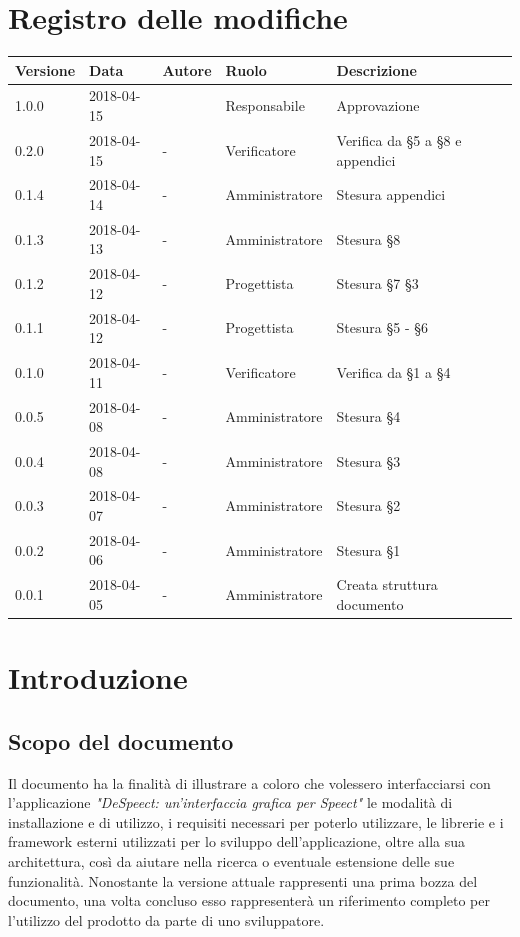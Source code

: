 \documentclass[openany,12pt,a4paper]{report}
\begin{document}
	\chapter*{Registro delle modifiche}
	\setlength\LTleft{-22mm}
	\begin{longtable}{|p{20mm}|p{20mm}|p{40mm}|p{30mm}|p{50mm}|}
		\hline
		\textbf{Versione} & \textbf{Data} & \textbf{Autore} & \textbf{Ruolo} & \textbf{Descrizione} \\
		
		\hline 1.0.0 & 2018-04-15 &  & Responsabile & Approvazione \\
		\hline 0.2.0 & 2018-04-15 & - & Verificatore & Verifica da §5 a §8 e appendici \\
		\hline 0.1.4 & 2018-04-14 & - & Amministratore & Stesura appendici \\
		\hline 0.1.3 & 2018-04-13 & - & Amministratore & Stesura §8 \\
		\hline 0.1.2 & 2018-04-12 & - & Progettista & Stesura §7 §3 \\		
		\hline 0.1.1 & 2018-04-12 & - & Progettista & Stesura §5 - §6 \\
		\hline 0.1.0 & 2018-04-11 & - & Verificatore & Verifica da §1 a §4 \\
		\hline 0.0.5 & 2018-04-08 & - & Amministratore & Stesura §4 \\	
		\hline 0.0.4 & 2018-04-08 & - & Amministratore & Stesura §3 \\
		\hline 0.0.3 & 2018-04-07 & - & Amministratore & Stesura §2 \\
		\hline 0.0.2 & 2018-04-06 & - & Amministratore & Stesura §1 \\
		\hline 0.0.1 & 2018-04-05 & - & Amministratore & Creata struttura documento \\
		\hline
		
	\end{longtable}
	
	
	\tableofcontents
	
	
	\chapter{Introduzione}
	
	\section{Scopo del documento}
	
	Il documento ha la finalità di illustrare a coloro che volessero interfacciarsi con l’applicazione
	\textit{"DeSpeect: un'interfaccia grafica per Speect"} le modalità di installazione e di utilizzo, i requisiti necessari per poterlo utilizzare, le librerie e i \Gls{framework} esterni utilizzati per lo sviluppo dell’applicazione,
	oltre alla sua architettura, così da aiutare
	nella ricerca o eventuale estensione delle sue funzionalità. Nonostante la versione attuale rappresenti una prima bozza del documento, una volta concluso esso rappresenterà un riferimento completo per l’utilizzo del prodotto da parte di uno sviluppatore.
	
\end{document}
